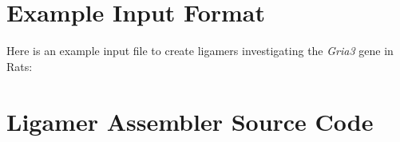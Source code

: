 \section{Example Input Format}
\begin{landscape}
Here is an example input file to create ligamers investigating the \textit{Gria3} gene in Rats:

\end{landscape}
\section{Ligamer Assembler Source Code}\label{apx: Ligamer Assmembler}



